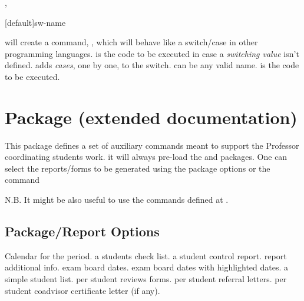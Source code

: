 \documentclass[dctools,english]{ufrgscca} %
\newif\iffulldoc
\begin{document}
\begin{Macros}{\mkswitch,\addcase}
	\begin{Syntax}%
		\Macro{\mkswitch}[default]{sw-name}
	\end{Syntax}
	 will create a command, , which will behave like a switch/case in other programming languages.  is the code to be executed in case a \emph{switching value} isn't defined.
	\Macro{\addcase}{} adds \emph{cases}, one by one, to the switch.  can be any \Macro{\csname}{} valid name.  is the code to be executed.

	\begin{stcode}[st=d.switch]
		\mkswitch[\gr@depcut]\gr@case@angle
		\addcase{}
		\addcase{}
	\end{stcode}
\end{Macros}
\fi

\iffulldoc
\section{ Package (extended documentation)}
This package defines a set of auxiliary commands meant to support the Professor coordinating students work.
it will always pre-load the  and  packages. One can select the reports/forms to be generated using the package options or the command 

N.B. It might be also useful to use the commands defined at .

\subsection{Package/Report Options}\label{ufrgscca-coord.options}
\begin{Options}
	 Calendar for the period.
	 a students check list.
	 a student control report.
	 report additional info.
	 exam board dates.
	 exam board dates with highlighted dates.
	 a simple student list.
	 per student reviews forms.
	 per student referral letters.
	 per student coadvisor certificate letter (if any).
\end{Options}
\end{document}
